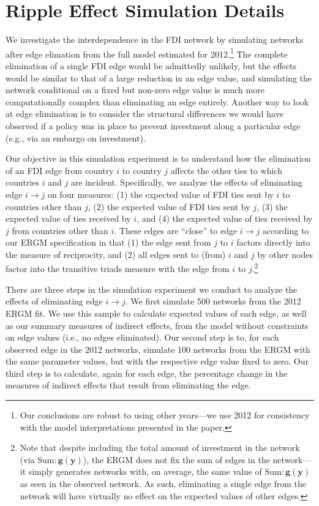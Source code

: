 \documentclass[reqno,onecolumn,letterpaper,12pt]{article}
\begin{document}
{\section{Ripple Effect Simulation Details}\label{ripple_sim}

We investigate the interdependence in the FDI network by simulating networks after edge elimation from the full model estimated for 2012.\footnote{Our conclusions are robust to using other years---we use 2012 for consistency with the model interpretations presented in the paper.} The complete elimination of a single FDI edge would be admittedly unlikely, but the effects would be similar to that of a large reduction in an edge value, and simulating the network conditional on a fixed but non-zero edge value is much more computationally complex than eliminating an edge entirely. Another way to look at edge elimination is to consider the structural differences we would have observed if a policy was in place to prevent investment along a particular edge (e.g., via an embargo on investment).

Our objective in this simulation experiment is to understand how the elimination of an FDI edge from country $i$ to country $j$ affects the other ties to which countries $i$ and $j$ are incident. Specifically, we analyze the effects of eliminating edge $i \rightarrow j$  on four measures: (1) the expected value of FDI ties sent by $i$ to countries other than $j$, (2) the expected value of FDI ties sent by $j$, (3) the expected value of ties received by $i$, and (4) the expected value of ties received by $j$ from countries other than $i$.  These edges are ``close'' to edge $i \rightarrow j$ according to our ERGM specification in that (1) the edge sent from $j$ to $i$ factors directly into the measure of reciprocity, and (2) all edges sent to (from) $i$ and $j$ by other nodes factor into the transitive triads measure with the edge from $i$ to $j$.\footnote{Note that despite including the total amount of investment in the network (via $\text{Sum}:\bm{g(y)}$), the ERGM does not fix the sum of edges in the network---it simply generates networks with, on average, the same value of $\text{Sum}:\bm{g(y)}$ as seen in the observed network. As such, eliminating a single edge from the network will have virtually no effect on the expected values of other edges.}

There are three steps in the simulation experiment we conduct to analyze the effects of eliminating edge $i \rightarrow j$. We first simulate 500 networks from the 2012 ERGM fit. We use this sample to calculate expected values of each edge, as well as our summary measures of indirect effects, from the model without constraints on edge values (i.e., no edges eliminated). Our second step is to, for each observed edge in the 2012 networks, simulate 100 networks from the ERGM with the same parameter values, but with the respective edge value fixed to zero. Our third step is to calculate, again for each edge, the percentage change in the measures of indirect effects that result from eliminating the edge.

}
\end{document}
